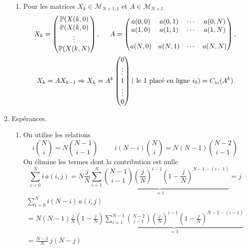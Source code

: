 \begin{enumerate}
\begin{enumerate}
  \item Pour les matrices $X_k\in \mathcal{M}_{N+1,1}$ et $A\in \mathcal{M}_{N+1}$ 
\begin{multline*}
X_k = 
\begin{pmatrix}
\mathbb{P}(X(k,0) \\  \mathbb{P}(X(k,0) \\ \vdots \\ \mathbb{P}(X(k,N)
\end{pmatrix},
\hspace{0.5cm}
A =
\begin{pmatrix}
a(0,0) & a(0,1) & \cdots & a(0,N) \\
a(1,0) & a(1,1) & \cdots & a(1,N) \\
       &        &        &        \\
a(N,0) & a(N,1) & \cdots & a(N,N) \\       
\end{pmatrix},\\
X_{k} = A X_{k-1} \Rightarrow X_k = A^{k}
\begin{pmatrix}
  0 \\ \vdots \\1 \\ \vdots \\ 0
\end{pmatrix} \left( \text{ le } 1 \text{ placé en ligne } i_0\right) 
= C_{i_0}(A^k)
\end{multline*}
\end{enumerate}

  \item Espérances.
\begin{enumerate}
  \item On utilise les relations
\begin{displaymath}
i\binom{N}{i} = N\binom{N-1}{i-1} \hspace{1cm} i(N-i)\binom{N}{i} = N(N-1)\binom{N-2}{i-1} 
\end{displaymath}
On élimine les termes dont la contribution est nulle
\begin{displaymath}
\sum_{i=0}^N i\, a(i,j) = 
N\frac{j}{N} \underset{=1}{\underbrace{\sum_{i=1}^N \binom{N-1}{i-1}\left( \frac{j}{N}\right)^{i-1}\left( 1-\frac{j}{N}\right)^{N-1-(i-1)}}}
= j
\end{displaymath}
\begin{multline*}
\sum_{i=0}^N i(N-i)\, a(i,j) \\
=N(N-1)\frac{j}{N}\left( 1-\frac{j}{N}\right) \underset{=1}{\underbrace{\sum_{i=1}^{N-1} \binom{N-2}{i-1}\left( \frac{j}{N}\right)^{i-1}\left( 1-\frac{j}{N}\right)^{N-2-(i-1)}}}\\
= \frac{N-1}{N}\,j ( N -j)
\end{multline*}


\end{enumerate}
\end{enumerate}
